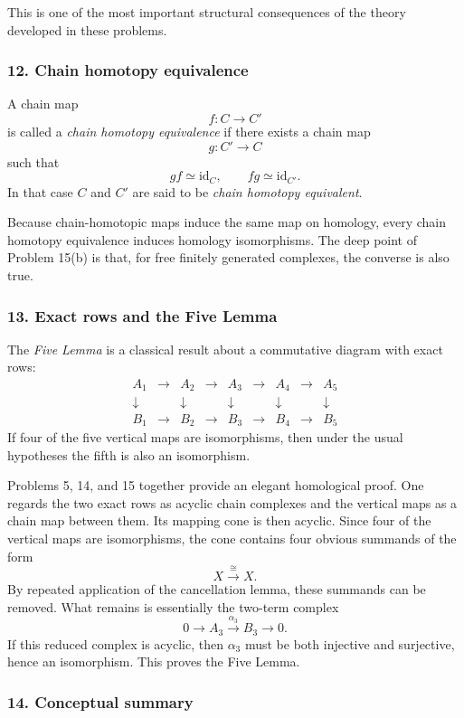 \documentclass[12pt,a4paper]{article}
\theoremstyle{notespace}
\begin{document}
This is one of the most important structural consequences of the theory developed in these problems.

\subsubsection*{12. Chain homotopy equivalence}

A chain map
\[
f:C\to C'
\]
is called a \emph{chain homotopy equivalence} if there exists a chain map
\[
g:C'\to C
\]
such that
\[
gf\simeq \mathrm{id}_C,
\qquad
fg\simeq \mathrm{id}_{C'}.
\]
In that case \(C\) and \(C'\) are said to be \emph{chain homotopy equivalent}.

Because chain-homotopic maps induce the same map on homology, every chain homotopy equivalence induces homology isomorphisms. The deep point of Problem 15(b) is that, for free finitely generated complexes, the converse is also true.

\subsubsection*{13. Exact rows and the Five Lemma}

The \emph{Five Lemma} is a classical result about a commutative diagram with exact rows:
\[
\begin{array}{ccccccccc}
	A_1 &\to& A_2 &\to& A_3 &\to& A_4 &\to& A_5\\
	\downarrow && \downarrow && \downarrow && \downarrow && \downarrow \\
	B_1 &\to& B_2 &\to& B_3 &\to& B_4 &\to& B_5
\end{array}
\]
If four of the five vertical maps are isomorphisms, then under the usual hypotheses the fifth is also an isomorphism.

Problems 5, 14, and 15 together provide an elegant homological proof. One regards the two exact rows as acyclic chain complexes and the vertical maps as a chain map between them. Its mapping cone is then acyclic. Since four of the vertical maps are isomorphisms, the cone contains four obvious summands of the form
\[
X\xrightarrow{\cong}X.
\]
By repeated application of the cancellation lemma, these summands can be removed. What remains is essentially the two-term complex
\[
0\to A_3\xrightarrow{\alpha_3}B_3\to 0.
\]
If this reduced complex is acyclic, then \(\alpha_3\) must be both injective and surjective, hence an isomorphism. This proves the Five Lemma.

\subsubsection*{14. Conceptual summary}
\end{document}

